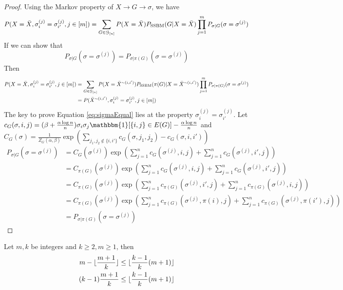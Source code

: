 \documentclass{article}
\begin{document}
\begin{proof}
Using the Markov property of $X \to G \to \sigma$, we have
\begin{align*}
P(X=\bar{X}, \sigma_i^{(j)} = \sigma_{i'}^{(j)}, j\in[m]) & = \sum_{G \in \mathcal{G}_{[n]}} P(X=\bar{X}) P_{\operatorname{SSBM}}(G  | X = \bar{X})\prod_{j=1}^m P_{\sigma | G}(\sigma =\sigma^{(j)})\\
\end{align*}
If we can show that 
\begin{equation}\label{eq:sigmaEqual}
P_{\sigma | G}(\sigma =\sigma^{(j)}) = P_{\sigma | \pi(G)}(\sigma =\sigma^{(j)})
\end{equation}
Then 
\begin{align*}
P(X=\bar{X}, \sigma_i^{(j)} = \sigma_{i'}^{(j)}, j\in[m]) & = \sum_{G \in \mathcal{G}_{[n]}} P(X=\bar{X}^{\sim(i,i')}) P_{\operatorname{SSBM}}(\pi(G)  | X = \bar{X}^{\sim(i,i')})\prod_{j=1}^m P_{\sigma | \pi(G)}(\sigma =\sigma^{(j)})\\
& = P(\bar{X}^{\sim(i,i')}, \sigma_i^{(j)} = \sigma_{i'}^{(j)}, j\in[m])
\end{align*}
The key to prove Equation \eqref{eq:sigmaEqual} lies at the property $\sigma^{(j)}_i = \sigma^{(j)}_{i'}$.
Let $c_G(\sigma, i,j) = (\beta + \frac{\alpha \log n}{n})\sigma_i \sigma_j \mathbbm{1}[\{i,j\}\in E(G)]  - \frac{\alpha \log n}{n}$
and $C_G(\sigma) = \frac{1}{Z_G(\alpha, \beta)}\exp(\sum_{j_1, j_2 \not\in \{i,i'\}} c_G(\sigma, j_1, j_2) - c_G(\sigma, i,i'))$
\begin{align*}
P_{\sigma | G}(\sigma =\sigma^{(j)}) & = C_G(\sigma^{(j)})\exp(\sum_{j=1}^n c_G(\sigma^{(j)}, i,j)+ \sum_{j=1}^n c_G(\sigma^{(j)}, i',j) ) \\
& = C_{\pi(G)}(\sigma^{(j)})\exp(\sum_{j=1}^n c_G(\sigma^{(j)}, i,j)+ \sum_{j=1}^n c_G(\sigma^{(j)}, i',j) ) \\
& = C_{\pi(G)}(\sigma^{(j)})\exp(\sum_{j=1}^n c_{\pi(G)}(\sigma^{(j)}, i',j)+ \sum_{j=1}^n c_{\pi(G)}(\sigma^{(j)}, i,j) ) \\
& = C_{\pi(G)}(\sigma^{(j)})\exp(\sum_{j=1}^n c_{\pi(G)}(\sigma^{(j)}, \pi(i), j)+ \sum_{j=1}^n c_{\pi(G)}(\sigma^{(j)}, \pi(i'),j) ) \\
& = P_{\sigma | \pi(G)}(\sigma =\sigma^{(j)})
\end{align*}
\end{proof}
\begin{lemma}
	Let $m,k$ be integers and $k\geq 2, m\geq 1$, then
	\begin{align}
	m - \lfloor {m + 1 \over k} \rfloor & \leq  \lfloor {k - 1 \over k}(m+1) \rfloor \label{eq:m1} \\
	(k-1) {m + 1 \over k}& \leq  \lfloor {k-1 \over k}(m+1) \rfloor \label{eq:m2}
	\end{align}
\end{lemma}
\end{document}
